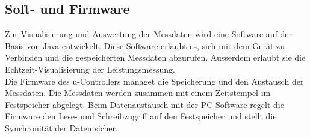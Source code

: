 \documentclass[12pt,a4paper]{article}
\begin{document}
\subsection{Soft- und Firmware}
Zur Visualisierung und Auswertung der Messdaten wird eine Software auf der Basis von Java entwickelt. Diese Software erlaubt es, sich mit dem Gerät zu Verbinden und die gespeicherten Messdaten abzurufen. Ausserdem erlaubt sie die Echtzeit-Visualisierung der Leistungsmessung. 
\\
Die Firmware des u-Controllers managet die Speicherung und den Austausch der Messdaten. Die Messdaten werden zusammen mit einem Zeitstempel im Festspeicher abgelegt. Beim Datenaustausch mit der PC-Software regelt die Firmware den Lese- und Schreibzugriff auf den Festspeicher und stellt die Synchronität der Daten sicher. 
\end{document}
